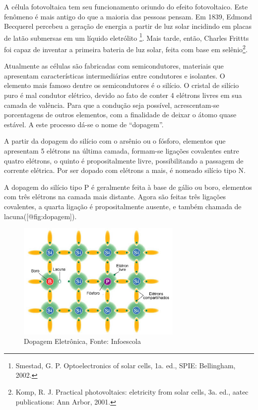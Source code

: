 \documentclass[
]{article}
\begin{document}
A célula fotovoltaica tem seu funcionamento oriundo do efeito
fotovoltaico. Este fenômeno é mais antigo do que a maioria das pessoas
pensam. Em 1839, Edmond Becquerel percebeu a geração de energia a partir
de luz solar incidindo em placas de latão submersas em um líquido
eletrólito \footnote{Smestad, G. P. Optoelectronics of solar cells, 1a.
  ed., SPIE: Bellingham, 2002.}. Mais tarde, então, Charles Frittts foi
capaz de inventar a primeira bateria de luz solar, feita com base em
selênio\footnote{Komp, R. J. Practical photovoltaics: eletricity from
  solar cells, 3a. ed., aatec publications: Ann Arbor, 2001.}.

Atualmente as células são fabricadas com semicondutores, materiais que
apresentam características intermediárias entre condutores e isolantes.
O elemento mais famoso dentre os semicondutores é o silício. O cristal
de silício puro é mal condutor elétrico, devido ao fato de conter 4
elétrons livres em sua camada de valência. Para que a condução seja
possível, acrescentam-se porcentagens de outros elementos, com a
finalidade de deixar o átomo quase estável. A este processo dá-se o nome
de ``dopagem''.

A partir da dopagem do silício com o arsênio ou o fósforo, elementos que
apresentam 5 elétrons na última camada, formam-se ligações covalentes
entre quatro elétrons, o quinto é propositalmente livre, possibilitando
a passagem de corrente elétrica. Por ser dopado com elétrons a mais, é
nomeado silício tipo N.

A dopagem do silício tipo P é geralmente feita à base de gálio ou boro,
elementos com três elétrons na camada mais distante. Agora são feitas
três ligações covalentes, a quarta ligação é propositalmente ausente, e
também chamada de lacuna({[}@fig:dopagem{]}).

\begin{figure}
\hypertarget{fig:dopagem}{%
\centering
\includegraphics[width=3.125in,height=\textheight]{img/fotovoltaico/dopagem_eletronica.jpg}
\caption{Dopagem Eletrônica, Fonte: Infoescola}\label{fig:dopagem}
}
\end{figure}
\end{document}
